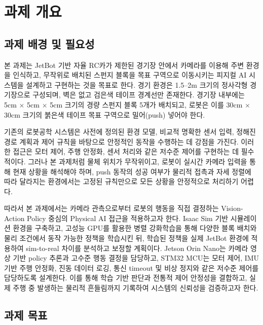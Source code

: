 \documentclass[titlepage]{pnureport}
\begin{document}
\maketitle

\tableofcontents
\clearpage
{}

\chapter{과제 개요}

\section{과제 배경 및 필요성}

본 과제는 JetBot 기반 자율 RC카가 제한된 경기장 안에서 카메라를 이용해 주변 환경을 인식하고, 무작위로 배치된 스펀지 블록을 목표 구역으로 이동시키는 피지컬 AI 시스템을 설계하고 구현하는 것을 목표로 한다. 경기 환경은 1.5--2m 크기의 정사각형 경기장으로 구성되며, 벽은 없고 검은색 테이프 경계선만 존재한다. 경기장 내부에는 5cm $\times$ 5cm $\times$ 5cm 크기의 경량 스펀지 블록 5개가 배치되고, 로봇은 이를 30cm $\times$ 30cm 크기의 붉은색 테이프 목표 구역으로 밀어(push) 넣어야 한다.

기존의 로봇공학 시스템은 사전에 정의된 환경 모델, 비교적 명확한 센서 입력, 정해진 경로 계획과 제어 규칙을 바탕으로 안정적인 동작을 수행하는 데 강점을 가진다. 이러한 접근은 모터 제어, 주행 안정화, 센서 처리와 같은 저수준 제어를 구현하는 데 필수적이다. 그러나 본 과제처럼 물체 위치가 무작위이고, 로봇이 실시간 카메라 입력을 통해 현재 상황을 해석해야 하며, push 동작의 성공 여부가 물리적 접촉과 자세 정렬에 따라 달라지는 환경에서는 고정된 규칙만으로 모든 상황을 안정적으로 처리하기 어렵다.

따라서 본 과제에서는 카메라 관측으로부터 로봇의 행동을 직접 결정하는 Vision-Action Policy 중심의 Physical AI 접근을 적용하고자 한다. Isaac Sim 기반 시뮬레이션 환경을 구축하고, 고성능 GPU를 활용한 병렬 강화학습을 통해 다양한 블록 배치와 물리 조건에서 동작 가능한 정책을 학습시킨 뒤, 학습된 정책을 실제 JetBot 환경에 적용하여 sim-to-real 차이를 분석하고 보정할 계획이다. Jetson Orin Nano는 카메라 영상 기반 policy 추론과 고수준 행동 결정을 담당하고, STM32 MCU는 모터 제어, IMU 기반 주행 안정화, 진동 데이터 로깅, 통신 timeout 및 비상 정지와 같은 저수준 제어를 담당하도록 설계한다. 이를 통해 학습 기반 판단과 전통적 제어 안정성을 결합하고, 실제 주행 중 발생하는 물리적 흔들림까지 기록하여 시스템의 신뢰성을 검증하고자 한다.

\section{과제 목표}
\end{document}
